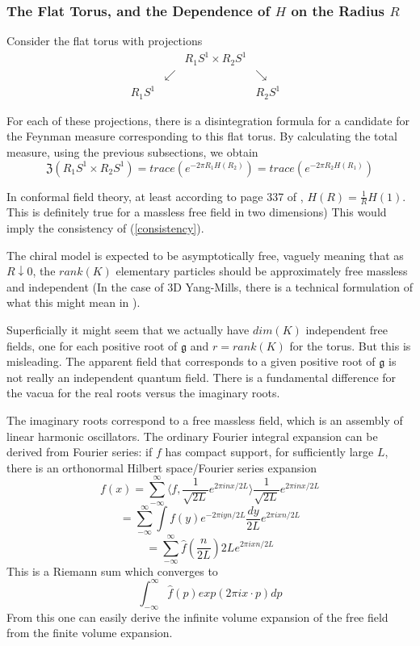 \documentclass{amsart}
\theoremstyle{conjecture}
\theoremstyle{definition}
\theoremstyle{question}
\theoremstyle{questions}
\theoremstyle{remark}
\theoremstyle{remarks}
\theoremstyle{example}
\numberwithin{equation}{section}
\begin{document}
\subsubsection{The Flat Torus, and the Dependence of $H$ on the Radius $R$}\label{flat torus}


Consider the flat torus with projections
$$\begin{matrix} & & R_1S^1 \times R_2S^1 & & \\
& \swarrow& & \searrow & \\
R_1S^1 & & & R_2 S^1 \end{matrix} $$

For each of these projections, there is a disintegration formula for a candidate for the Feynman measure
corresponding to this flat torus. By calculating the total measure, using the previous subsections, we obtain
\begin{equation}\label{consistency}\mathfrak Z(R_1S^1 \times R_2S^1)=trace(e^{-2\pi R_1 H(R_2)})=trace(e^{-2\pi R_2 H(R_1)})\end{equation}

In conformal field theory, at least according to page 337 of \cite{DMS}, $H(R)=\frac 1R H(1)$. This is definitely true
for a massless free field in two dimensions) This would imply the consistency of (\ref{consistency}). 


The chiral model is expected to be asymptotically free, vaguely meaning that as $R\downarrow 0$, the $rank(K)$ elementary particles should be approximately free massless and independent (In the case of 3D Yang-Mills, there is a technical formulation of what this might mean in \cite{CC}). 

Superficially it might seem that we actually have $dim(K)$ independent free fields, one for each positive root
of $\mathfrak g$ and $r=rank(K)$ for the torus. But this is misleading. The apparent field that corresponds
to a given positive root of $\mathfrak g$ is not really an independent quantum field. There is a fundamental difference for the vacua for the real roots versus the imaginary roots. 

The imaginary roots correspond to a free massless field, which is an assembly of linear harmonic oscillators.
The ordinary Fourier integral expansion can be derived from Fourier series: if $f$ has compact support, for sufficiently large
$L$, there is an orthonormal Hilbert space/Fourier series expansion
$$f(x)=\sum_{-\infty}^{\infty}\langle f,\frac{1}{\sqrt{2L}}e^{2\pi in x/2L}\rangle\frac{1}{\sqrt{2L}} e^{2\pi in x/2L} $$
$$=\sum_{-\infty}^{\infty}\int f(y)e^{-2\pi i yn/2L} \frac{dy}{2L}e^{2\pi i xn/2L} $$
$$=\sum_{-\infty}^{\infty}\widehat f(\frac{n}{2L}){2L}e^{2\pi i xn/2L} $$
This is a Riemann sum which converges
to
$$\int_{-\infty}^{\infty}\widehat f(p)exp(2\pi ix\cdot p)dp $$
From this one can easily derive the infinite volume expansion of the free field from the finite volume expansion.
\end{document}
